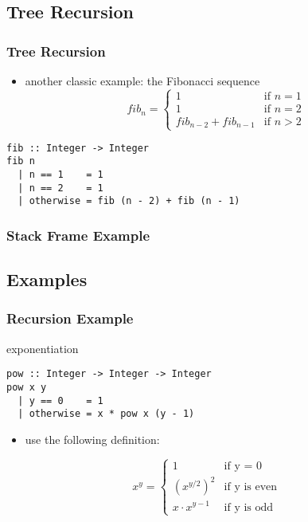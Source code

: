 \documentclass[dvipsnames]{beamer}
\theoremstyle{plain}
\begin{document}
\subsection{Tree Recursion}

\begin{frame}[fragile]
  \frametitle{Tree Recursion}

  \begin{itemize}
    \item another classic example: the Fibonacci sequence
    \[
      fib_n =
        \begin{cases}
          1                     & \mbox{if } n = 1\\
          1                     & \mbox{if } n = 2\\
          fib_{n-2} + fib_{n-1} & \mbox{if } n > 2
        \end{cases}
    \]
  \end{itemize}

  \begin{exampleblock}{}
    \begin{lstlisting}
fib :: Integer -> Integer
fib n
  | n == 1    = 1
  | n == 2    = 1
  | otherwise = fib (n - 2) + fib (n - 1)
    \end{lstlisting}
  \end{exampleblock}
\end{frame}

\begin{frame}[fragile]
  \frametitle{Stack Frame Example}

  \begin{center}
  \end{center}
\end{frame}

\subsection{Examples}

\begin{frame}[fragile]
  \frametitle{Recursion Example}

  \begin{exampleblock}{exponentiation}
    \begin{lstlisting}
pow :: Integer -> Integer -> Integer
pow x y
  | y == 0    = 1
  | otherwise = x * pow x (y - 1)
    \end{lstlisting}
  \end{exampleblock}

  \pause
  \begin{itemize}
    \item use the following definition:
  \end{itemize}
  \[
    x^y =
      \begin{cases}
        1               & \mbox{if y = 0}\\
        {(x^{y/2})}^2   & \mbox{if y is even}\\
        x \cdot x^{y-1} & \mbox{if y is odd}
      \end{cases}
  \]
\end{frame}
\end{document}
